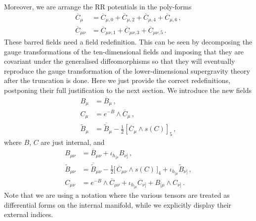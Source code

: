 \documentclass[debug]{phd}
\begin{document}
			Moreover, we are arrange the RR potentials in the poly-forms 
					\begin{equation}
						\begin{split}
							\overline{C}_\mu &= \overline{C}_{\mu,0} + \overline{C}_{\mu,2} + \overline{C}_{\mu,4} + \overline{C}_{\mu,6}\,, \\
							\overline{C}_{\mu\nu} &= \overline{C}_{\mu\nu,1} + \overline{C}_{\mu\nu,3} + \overline{C}_{\mu\nu,5}\,.
						\end{split}
					\end{equation}
			These barred fields need a field redefinition. 
			This can be seen by decomposing the gauge transformations of the ten-dimensional fields and imposing that they are covariant under the generalised diffeomorphisms so that they will eventually reproduce the gauge transformation of the lower-dimensional supergravity theory after the truncation is done. 
			Here we just provide the correct redefinitions, postponing their full justification to the next section. 
			We introduce the new fields
					\begin{equation}\label{redef_one_forms}
						\begin{split}
							B_{\mu} &= \overline{B}_\mu \, , \\
							C_\mu &= e^{-B}\wedge \overline{C}_\mu \, , \\
							\tilde{B}_\mu &= \overline{\tilde{B}}_\mu - \tfrac{1}{2} [ \overline{C}_\mu \wedge s(C)]_5 \, ,
						\end{split}
					\end{equation}
			where $B$, $C$ are just internal, and
					\begin{equation}\label{redef_two_forms}
						\begin{split}
							B_{\mu\nu}&= \overline{B}_{\mu\nu} + \iota_{h_{[\mu}}B_{\nu]} \,, \\
							\tilde B_{\mu\nu}&= \overline{\tilde B}_{\mu\nu} - \tfrac{1}{2} \big[ \,\overline{C}_{\mu\nu} \wedge s(C)\, \big]_4 + \iota_{h_{[\mu}} \tilde{B}_{\nu]} \,, \\
							C_{\mu\nu} &= e^{-B} \wedge \overline{C}_{\mu\nu} + \iota_{h_{[\mu}} C_{\nu]} + B_{[\mu}\wedge C_{\nu]} \,.
						\end{split}
					\end{equation}
			Note that we are using a notation where the various tensors are treated as differential forms on the internal manifold, while we explicitly display their external indices.
\end{document}
